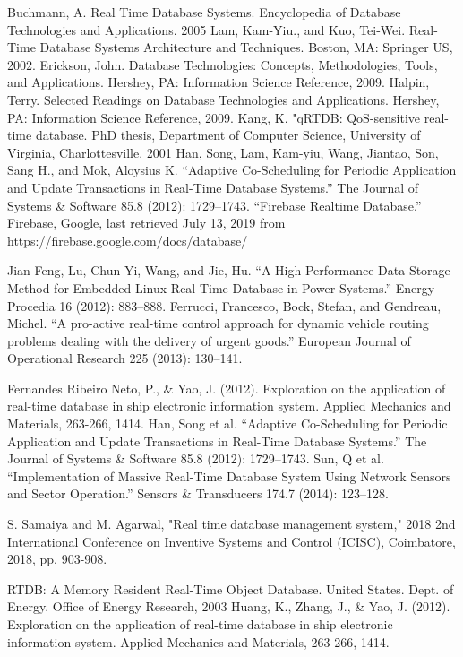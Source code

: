 \documentclass[conference]{IEEEtran}
\begin{document}
\begin{thebibliography}{00}
 Buchmann, A. Real Time Database Systems. Encyclopedia of Database Technologies and Applications. 2005
 Lam, Kam-Yiu., and Kuo, Tei-Wei. Real-Time Database Systems Architecture and Techniques. Boston, MA: Springer US, 2002. 
 Erickson, John. Database Technologies: Concepts, Methodologies, Tools, and Applications. Hershey, PA: Information Science Reference, 2009. 
 Halpin, Terry. Selected Readings on Database Technologies and Applications. Hershey, PA: Information Science Reference, 2009. 
 Kang, K. "qRTDB: QoS-sensitive real-time database. PhD thesis, Department of Computer Science, University of Virginia, Charlottesville. 2001
 Han, Song, Lam, Kam-yiu, Wang, Jiantao, Son, Sang H., and Mok, Aloysius K.  “Adaptive Co-Scheduling for Periodic Application and Update Transactions in Real-Time Database Systems.” The Journal of Systems \& Software 85.8 (2012): 1729–1743.
 “Firebase Realtime Database.” Firebase, Google, last retrieved July 13, 2019 from https://firebase.google.com/docs/database/


 Jian-Feng, Lu, Chun-Yi, Wang, and Jie, Hu. “A High Performance Data Storage Method for Embedded Linux Real-Time Database in Power Systems.” Energy Procedia 16 (2012): 883–888.
 Ferrucci, Francesco, Bock, Stefan, and Gendreau, Michel. “A pro-active real-time control approach for dynamic vehicle routing problems dealing with the delivery of urgent goods.” European Journal of Operational Research 225 (2013): 130–141.


 Fernandes Ribeiro Neto, P.,  \& Yao, J. (2012). Exploration on the application of real-time database in ship electronic information system. Applied Mechanics and Materials, 263-266, 1414. 
 Han, Song et al. “Adaptive Co-Scheduling for Periodic Application and Update Transactions in Real-Time Database Systems.” The Journal of Systems \& Software 85.8 (2012): 1729–1743.
 Sun, Q et al. “Implementation of Massive Real-Time Database System Using Network Sensors and Sector Operation.” Sensors \& Transducers 174.7 (2014): 123–128.

 S. Samaiya and M. Agarwal, "Real time database management system," 2018 2nd International Conference on Inventive Systems and Control (ICISC), Coimbatore, 2018, pp. 903-908.

 RTDB: A Memory Resident Real-Time Object Database. United States. Dept. of Energy. Office of Energy Research, 2003
 Huang, K., Zhang, J., \& Yao, J. (2012). Exploration on the application of real-time database in ship electronic information system. Applied Mechanics and Materials, 263-266, 1414. 



\end{thebibliography}
\end{document}
